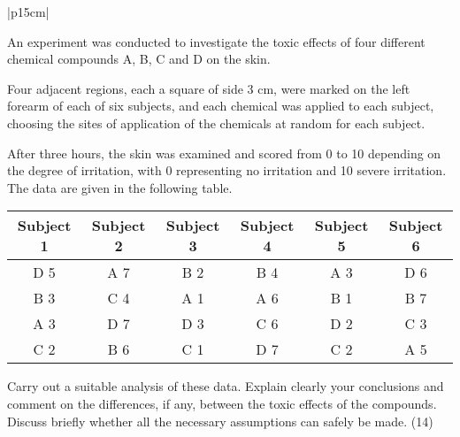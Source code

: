 \documentclass[a4paper,12pt]{article}
\begin{document}
\begin{table}[ht!]
 
\centering
 
\begin{tabular}{|p{15cm}|}
 
\hline  

 An experiment was conducted to investigate the toxic effects of four different chemical compounds A, B, C and D on the skin.  

Four adjacent regions, each a square of side 3 cm, were marked on the left forearm of each of six subjects, and each chemical was applied to each subject, 
choosing the sites of application of the chemicals at random for each subject.  

After three hours, the skin was examined and scored from 0 to 10 depending on the degree of irritation, with 0 representing no irritation and 10 severe irritation.  
The data are given in the following table. 

\begin{center}
\begin{tabular}{|c|c|c|c|c|c|} 


Subject 1 &  Subject 2 &  Subject 3&  Subject 4 &  Subject 5 & Subject 6 \\ \hline

D  5  &  A  7  &  B  2 &  B  4 & A  3 &  D  6  \\ \hline
B  3  & C  4 & A  1 & A  6&  B  1 & B  7 \\ \hline 
A  3  &   D  7 &  D  3 & C  6 &  D  2 &  C  3 \\ \hline
C  2  &  B  6 & C  1  & D  7 & C  2 & A  5  \\ \hline
\end{tabular}
\end{center}
 
Carry out a suitable analysis of these data.  Explain clearly your conclusions and comment on the differences, if any, between the toxic effects of the compounds.  Discuss briefly whether all the necessary assumptions can safely be made. (14) 
 

\\ \hline
  
\end{tabular}

\end{table} 
\end{document}
